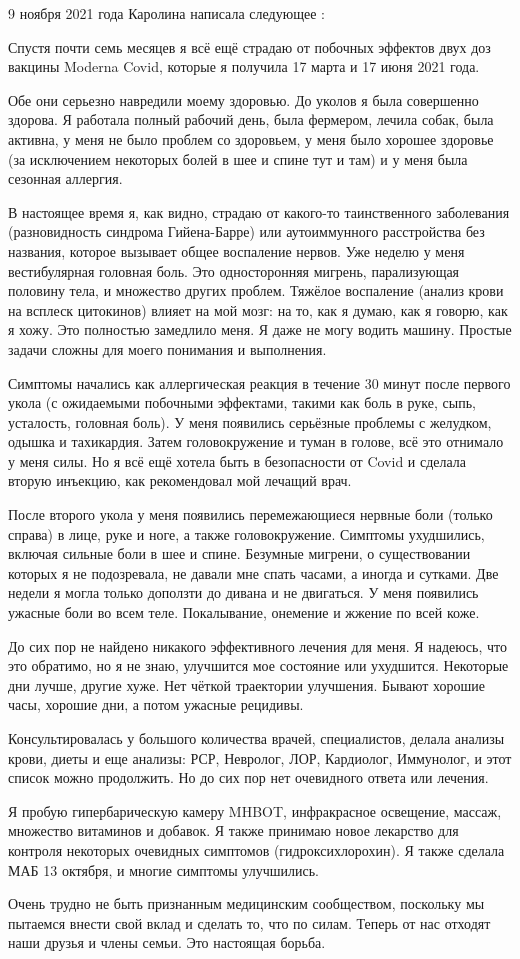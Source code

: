 9 ноября 2021 года Каролина написала следующее :

Спустя почти семь месяцев я всё ещё страдаю от побочных эффектов двух доз
вакцины Moderna Covid, которые я получила 17 марта и 17 июня 2021 года.

Обе они серьезно навредили моему здоровью. До уколов я была совершенно
здорова. Я работала полный рабочий день, была фермером, лечила собак, была
активна, у меня не было проблем со здоровьем, у меня было хорошее здоровье (за
исключением некоторых болей в шее и спине тут и там) и у меня была сезонная
аллергия.

В настоящее время я, как видно, страдаю от какого-то таинственного заболевания
(разновидность синдрома Гийена-Барре) или аутоиммунного расстройства без
названия, которое вызывает общее воспаление нервов. Уже неделю у меня
вестибулярная головная боль. Это односторонняя мигрень, парализующая половину
тела, и множество других проблем. Тяжёлое воспаление (анализ крови на всплеск
цитокинов) влияет на мой мозг: на то, как я думаю, как я говорю, как я хожу. Это
полностью замедлило меня. Я даже не могу водить машину. Простые задачи сложны
для моего понимания и выполнения.

Симптомы начались как аллергическая реакция в течение 30 минут после первого
укола (с ожидаемыми побочными эффектами, такими как боль в руке, сыпь,
усталость, головная боль). У меня появились серьёзные проблемы с желудком,
одышка и тахикардия. Затем головокружение и туман в голове, всё это отнимало у
меня силы. Но я всё ещё хотела быть в безопасности от Covid и сделала вторую
инъекцию, как рекомендовал мой лечащий врач.

После второго укола у меня появились перемежающиеся нервные боли (только справа)
в лице, руке и ноге, а также головокружение. Симптомы ухудшились, включая
сильные боли в шее и спине. Безумные мигрени, о существовании которых я не
подозревала, не давали мне спать часами, а иногда и сутками. Две недели я могла
только доползти до дивана и не двигаться. У меня появились ужасные боли во всем
теле. Покалывание, онемение и жжение по всей коже.

До сих пор не найдено никакого эффективного лечения для меня. Я надеюсь, что это
обратимо, но я не знаю, улучшится мое состояние или ухудшится. Некоторые дни
лучше, другие хуже. Нет чёткой траектории улучшения. Бывают хорошие часы,
хорошие дни, а потом ужасные рецидивы.

Консультировалась у большого количества врачей, специалистов, делала анализы
крови, диеты и еще анализы: РСР, Невролог, ЛОР, Кардиолог, Иммунолог, и этот
список можно продолжить. Но до сих пор нет очевидного ответа или лечения.

Я пробую гипербарическую камеру MHBOT, инфракрасное освещение, массаж, множество
витаминов и добавок. Я также принимаю новое лекарство для контроля некоторых
очевидных симптомов (гидроксихлорохин). Я также сделала МАБ 13 октября, и многие
симптомы улучшились.

Очень трудно не быть признанным медицинским сообществом, поскольку мы пытаемся
внести свой вклад и сделать то, что по силам. Теперь от нас отходят наши друзья
и члены семьи. Это настоящая борьба.
